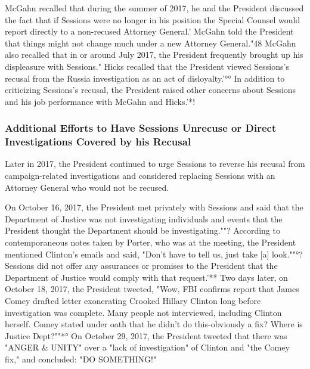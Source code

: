 McGahn recalled that during the summer of 2017, he and the President discussed the fact that if Sessions were no longer in his position the Special Counsel would report directly to a non-recused Attorney General.'
McGahn told the President that things might not change much under a new Attorney General."48
McGahn also recalled that in or around July 2017, the President frequently brought up his displeasure with Sessions."
Hicks recalled that the President viewed Sessions's recusal from the Russia investigation as an act of disloyalty.'°°
In addition to criticizing Sessions's recusal, the President raised other concerns about Sessions and his job performance with McGahn and Hicks.'*!

\subsubsection{Additional Efforts to Have Sessions Unrecuse or Direct Investigations Covered by his Recusal}

Later in 2017, the President continued to urge Sessions to reverse his recusal from campaign-related investigations and considered replacing Sessions with an Attorney General who would not be recused.

On October 16, 2017, the President met privately with Sessions and said that the Department of Justice was not investigating individuals and events that the President thought the Department should be investigating.""?
According to contemporaneous notes taken by Porter, who was at the meeting, the President mentioned Clinton's emails and said, "Don't have to tell us, just take [a] look.""°?
Sessions did not offer any assurances or promises to the President that the Department of Justice would comply with that request.'**
Two days later, on October 18, 2017, the President tweeted, "Wow, FBI confirms report that James Comey drafted letter exonerating Crooked Hillary Clinton long before investigation was complete.
Many people not interviewed, including Clinton herself.
Comey stated under oath that he didn't do this-obviously a fix?
Where is Justice Dept?""*°
On October 29, 2017, the President tweeted that there was "ANGER \& UNITY" over a "lack of investigation" of Clinton and "the Comey fix," and concluded: "DO SOMETHING!"

